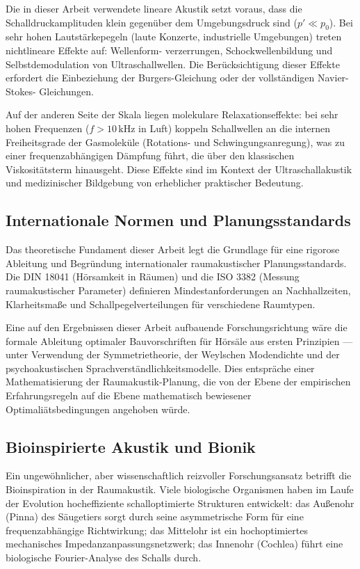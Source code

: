 ﻿\documentclass[12pt, a4paper]{article}
\theoremstyle{definition}
\theoremstyle{remark}
\begin{document}
Die in dieser Arbeit verwendete lineare Akustik setzt voraus, dass
die Schalldruckamplituden klein gegenüber dem Umgebungsdruck sind
($p' \ll p_0$). Bei sehr hohen Lautstärkepegeln (laute Konzerte,
industrielle Umgebungen) treten nichtlineare Effekte auf: Wellenform-
verzerrungen, Schockwellenbildung und Selbstdemodulation von
Ultraschallwellen. Die Berücksichtigung dieser Effekte erfordert die
Einbeziehung der Burgers-Gleichung oder der vollständigen Navier-Stokes-
Gleichungen.

Auf der anderen Seite der Skala liegen molekulare Relaxationseffekte:
bei sehr hohen Frequenzen ($f > 10\,\mathrm{kHz}$ in Luft) koppeln
Schallwellen an die internen Freiheitsgrade der Gasmoleküle
(Rotations- und Schwingungsanregung), was zu einer frequenzabhängigen
Dämpfung führt, die über den klassischen Viskositätsterm hinausgeht.
Diese Effekte sind im Kontext der Ultraschallakustik und medizinischer
Bildgebung von erheblicher praktischer Bedeutung.

\subsection{Internationale Normen und Planungsstandards}

Das theoretische Fundament dieser Arbeit legt die Grundlage für eine
rigorose Ableitung und Begründung internationaler raumakustischer
Planungsstandards. Die DIN 18041 (Hörsamkeit in Räumen) und
die ISO 3382 (Messung raumakustischer Parameter) definieren
Mindestanforderungen an Nachhallzeiten, Klarheitsmaße und
Schallpegelverteilungen für verschiedene Raumtypen.

Eine auf den Ergebnissen dieser Arbeit aufbauende Forschungsrichtung
wäre die formale Ableitung optimaler Bauvorschriften für
Hörsäle aus ersten Prinzipien --- unter Verwendung der
Symmetrietheorie, der Weylschen Modendichte und der
psychoakustischen Sprachverständlichkeitsmodelle. Dies entspräche
einer Mathematisierung der Raumakustik-Planung, die von der
Ebene der empirischen Erfahrungsregeln auf die Ebene mathematisch
bewiesener Optimaliätsbedingungen angehoben würde.

\subsection{Bioinspirierte Akustik und Bionik}

Ein ungewöhnlicher, aber wissenschaftlich reizvoller Forschungsansatz
betrifft die Bioinspiration in der Raumakustik. Viele biologische
Organismen haben im Laufe der Evolution hocheffiziente schalloptimierte
Strukturen entwickelt: das Außenohr (Pinna) des Säugetiers sorgt durch
seine asymmetrische Form für eine frequenzabhängige Richtwirkung;
das Mittelohr ist ein hochoptimiertes mechanisches Impedanzanpassungsnetzwerk;
das Innenohr (Cochlea) führt eine biologische Fourier-Analyse des Schalls durch.
\end{document}
